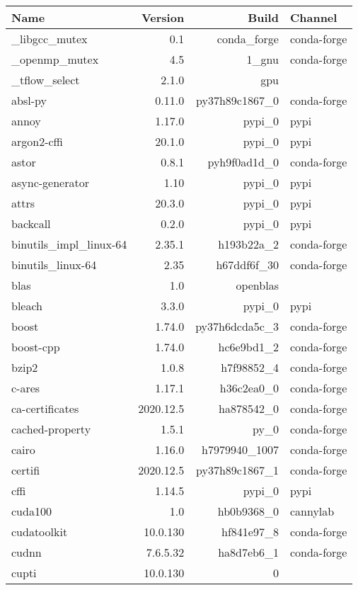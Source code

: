 \begin{table}
	\begin{center}
		\begin{tabular}{|l|r|r|l|}
			 \textbf{Name} &\textbf{Version} &\textbf{Build} &\textbf{Channel} \\
			 \hline
			\_libgcc\_mutex &0.1 & conda\_forge &conda-forge \\
			\_openmp\_mutex &4.5 & 1\_gnu &conda-forge \\
			\_tflow\_select &2.1.0 & gpu & \\
			absl-py &0.11.0 & py37h89c1867\_0 &conda-forge \\
			annoy &1.17.0 & pypi\_0 &pypi \\
			argon2-cffi &20.1.0 & pypi\_0 &pypi \\
			astor &0.8.1 & pyh9f0ad1d\_0 &conda-forge \\
			async-generator &1.10 & pypi\_0 &pypi \\
			attrs &20.3.0 & pypi\_0 &pypi \\
			backcall &0.2.0 & pypi\_0 &pypi \\
			binutils\_impl\_linux-64 &2.35.1 & h193b22a\_2 &conda-forge \\
			binutils\_linux-64 &2.35 & h67ddf6f\_30 &conda-forge \\
			blas &1.0 & openblas & \\
			bleach &3.3.0 & pypi\_0 &pypi \\
			boost &1.74.0 & py37h6dcda5c\_3 &conda-forge \\
			boost-cpp &1.74.0 & hc6e9bd1\_2 &conda-forge \\
			bzip2 &1.0.8 & h7f98852\_4 &conda-forge \\
			c-ares &1.17.1 & h36c2ea0\_0 &conda-forge \\
			ca-certificates &2020.12.5 & ha878542\_0 &conda-forge \\
			cached-property &1.5.1 & py\_0 &conda-forge \\
			cairo &1.16.0 & h7979940\_1007 &conda-forge \\
			certifi &2020.12.5 & py37h89c1867\_1 &conda-forge \\
			cffi &1.14.5 & pypi\_0 &pypi \\
			cuda100 &1.0 & hb0b9368\_0 &cannylab \\
			cudatoolkit &10.0.130 & hf841e97\_8 &conda-forge \\
			cudnn &7.6.5.32 & ha8d7eb6\_1 &conda-forge \\
			cupti &10.0.130 & 0 & \\

\end{tabular}
\end{center}
\end{table}
